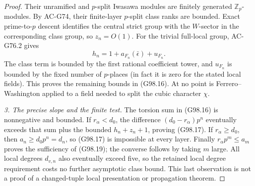 \begin{proof}
Their unramified and $p$-split Iwasawa modules are finitely
generated $\mathbb Z_p$-modules.  By AC-G74, their finite-layer $p$-split
class ranks are bounded.  Exact prime-to-$p$ descent identifies
the central strict group with the $W$-sector in the corresponding
class group, so $z_n=O(1)$.
For the trivial full-local group, AC-G76.2 gives
\[
 h_n=1+a_{F_n}(\bar\epsilon)+u_{F_n}.
 \tag{G98.23}
\]
The class term is bounded by the first rational coefficient tower,
and $u_{F_n}$ is bounded by the fixed number of $p$-places
(in fact it is zero for the stated local fields).
This proves the remaining bounds in (G98.16).
At no point is Ferrero--Washington applied to a field needed
to split the cubic character $\chi$.

\emph{3. The precise slope and the finite test.}
The torsion sum in (G98.16) is nonnegative and bounded.
If $r_\alpha<d_0$, the difference
$(d_0-r_\alpha)p^n$ eventually exceeds that sum plus the
bounded $h_n+z_n+1$, proving (G98.17).
If $r_\alpha\ge d_0$, then $a_n\ge d_0p^n=d_n$,
so (G98.17) is impossible at every layer.
Finally $r_\alpha p^m\le a_m$ proves the sufficiency of
(G98.19); the converse follows by taking $m$ large.
All local degrees $d_{v,n}$ also eventually exceed five,
so the retained local degree requirement costs no further
asymptotic class bound.  This last observation is not a proof
of a changed-tuple local presentation or propagation theorem.
\end{proof}

